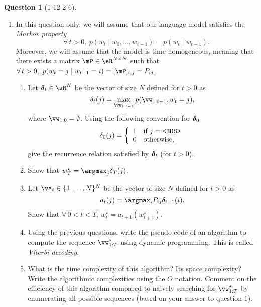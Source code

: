 \documentclass[12pt]{article}
\theoremstyle{definition}
\newtheorem{exercise}{Question}%
\begin{document}
\begin{exercise}[1-12-2-6]
{\begin{enumerate}[label=\arabic{exercise}.\arabic*]
    \item In this question only, we will assume that our language model satisfies the \emph{Markov property}
    \begin{equation*}
        \forall\, t>0,\ p(w_{t}\mid w_{0}, \ldots, w_{t-1}) = p(w_{t}\mid w_{t-1}).
    \end{equation*}
    Moreover, we will assume that the model is time-homogeneous, meaning that there exists a matrix $\mP \in \sR^{N\times N}$ such that $\forall\,t > 0,\ p(w_{t} = j \mid w_{t-1} = i) = [\mP]_{i, j} = P_{ij}$.
    \begin{enumerate}[label=\arabic{exercise}.\arabic{enumi}.\alph*]
        \item Let $\vdelta_{t} \in \sR^{N}$ be the vector of size $N$ defined for $t > 0$ as
        \begin{equation*}
            \delta_{t}(j) = \max_{\vw_{1:t-1}}p(\vw_{1:t-1}, w_{t} = j),
        \end{equation*}
        where $\vw_{1:0} = \emptyset$. Using the following convention for ${\bm{\delta}}_{0}$
        \begin{equation*}
            \delta_{0}(j) = \left\{\begin{array}{ll}
                1 & \textrm{if $j = \textrm{\texttt{<BOS>}}$}\\
                0 & \textrm{otherwise,}
            \end{array}\right.
        \end{equation*}
        give the recurrence relation satisfied by ${\bm{\delta}}_{t}$ (for $t > 0$).
        
        \item Show that $w_{T}^{\star} = \argmax_{j} \delta_{T}(j)$.
        
        \item Let $\va_{t} \in \{1, \ldots, N\}^{N}$ be the vector of size $N$ defined for $t > 0$ as
        \begin{equation*}
            a_{t}(j) = \argmax_{i}P_{ij}\delta_{t-1}(i).
        \end{equation*}
        Show that $\forall\, 0 < t < T$, $w_{t}^{\star} = a_{t+1}(w_{t+1}^{\star})$.
        
        \item Using the previous questions, write the pseudo-code of an algorithm to compute the sequence $\vw_{1:T}^{\star}$ using dynamic programming. This is called \emph{Viterbi decoding}.
        
        \item What is the time complexity of this algorithm? Its space complexity? Write the algorithmic complexities using the $O$ notation. Comment on the efficiency of this algorithm compared to naively searching for $\vw_{1:T}^{\star}$ by enumerating all possible sequences (based on your answer to question 1).
        

\end{enumerate}
\end{enumerate}}
\end{exercise}
\end{document}
